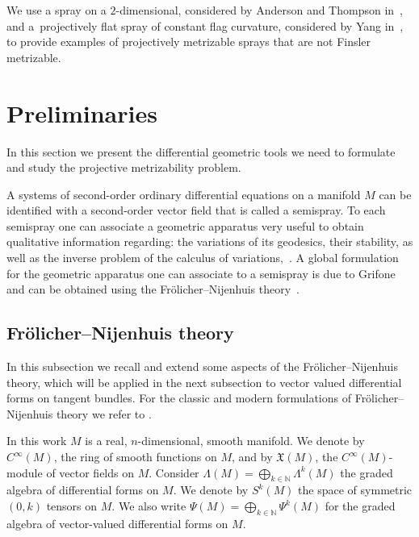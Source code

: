 \documentclass[pdftex]{sigma}
\numberwithin{equation}{section}
\begin{document}
We use a spray on a $2$-dimensional, considered
by Anderson and Thompson in~\cite{anderso92}, and a~projectively f\/lat
spray of constant f\/lag curvature, considered by Yang in~\cite{yang11}, to provide examples of
projectively metrizable sprays that are not Finsler metrizable.



\section{Preliminaries} \label{sec:prelim}

In this section we present the dif\/ferential geometric tools
we need to formulate and study the projective metrizability problem.

A systems of second-order ordinary dif\/ferential equations on a
manifold $M$ can be identif\/ied with a second-order vector f\/ield
that is called a semispray. To each semispray one can associate a
geometric apparatus very useful to obtain qualitative information
regarding: the variations of its geodesics, their stability, as
well as the inverse problem of the calculus of variations,~\cite{bcd10}.
A global formulation for the geometric apparatus one can associate
to a semispray is due to Grifone \cite{grifone72} and can be
obtained using the Fr\"olicher--Nijenhuis theo\-ry~\cite{frolicher56}.

\subsection[Fr\"olicher-Nijenhuis theory]{Fr\"olicher--Nijenhuis theory} \label{subsec:fn}

In this subsection we recall and extend some aspects of the
Fr\"olicher--Nijenhuis theory, which will be applied in the next
subsection to vector valued dif\/ferential forms on tangent bundles.
For the classic and modern formulations of Fr\"olicher--Nijenhuis theory we
refer to \cite{frolicher56, grifone72, grifone00, KMS93, deleon89}.

In this work $M$ is a real, $n$-dimensional, smooth manifold. We
denote by $C^{\infty}(M)$, the ring of smooth functions on $M$,
and by ${\mathfrak X}(M)$, the $C^{\infty}(M)$-module of vector
f\/ields on $M$. Consider $\Lambda(M)=\bigoplus_{k\in {\mathbb
N}}\Lambda^k(M)$ the graded algebra of dif\/ferential forms on $M$. We
denote by $S^k(M)$ the space of symmetric $(0,k)$ tensors on $M$.
We also write $\Psi(M)=\bigoplus_{k\in {\mathbb N}}\Psi^k(M)$ for the
graded algebra of vector-valued dif\/ferential forms on $M$.
\end{document}
